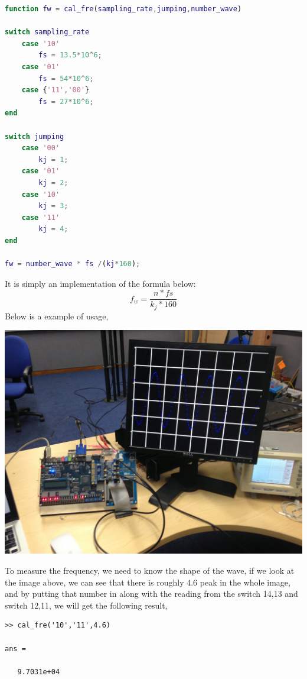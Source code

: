 \documentclass[11pt]{scrartcl}
\begin{document}
\begin{lstlisting}[language=Matlab]
function fw = cal_fre(sampling_rate,jumping,number_wave)

switch sampling_rate
    case '10'
        fs = 13.5*10^6;
    case '01'
        fs = 54*10^6;
    case {'11','00'}
        fs = 27*10^6;
end

switch jumping
    case '00'
        kj = 1;
    case '01'
        kj = 2;
    case '10'
        kj = 3;
    case '11'
        kj = 4;
end

fw = number_wave * fs /(kj*160);
\end{lstlisting}

It is simply an implementation of the formula below:
$$ f_w = \frac{n*fs}{k_j*160}$$
Below is a example of usage,
\begin{center}
\begin{minipage}[t]{\linewidth}

{
\includegraphics[scale = 0.05]{IMG_1388.JPG}
}
\end{minipage}
\medskip
\end{center}

To measure the frequency, we need to know the shape of the wave, if we look at the image above, we can see that there is roughly 4.6 peak in the whole image, and by putting that number in along with the reading from the switch 14,13 and switch 12,11, we will get the following result,

\begin{verbatim}
>> cal_fre('10','11',4.6)

ans =

   9.7031e+04
\end{verbatim}
\end{document}
